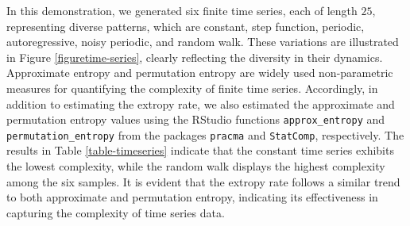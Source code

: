 \documentclass[pdflatex]{sn-jnl}%
\theoremstyle{thmstyleone}
\theoremstyle{thmstyletwo}%
\theoremstyle{thmstylethree}%
\begin{document}
In this demonstration, we generated six finite time series, each of length $25$, representing diverse patterns, which are constant, step function, periodic, autoregressive, noisy periodic, and random walk. These variations are illustrated in Figure \ref{figuretime-series}, clearly reflecting the diversity in their dynamics. Approximate entropy and permutation entropy are widely used non-parametric measures for quantifying the complexity of finite time series. Accordingly, in addition to estimating the extropy rate, we also estimated the approximate and permutation entropy values using the RStudio functions \texttt{approx\_entropy} and \texttt{permutation\_entropy} from the packages \texttt{pracma} and \texttt{StatComp}, respectively.
The results in Table \ref{table-timeseries} indicate that the constant time series exhibits the lowest complexity, while the random walk displays the highest complexity among the six samples. It is evident that the extropy rate follows a similar trend to both approximate and permutation entropy, indicating its effectiveness in capturing the complexity of time series data.


\end{document}
